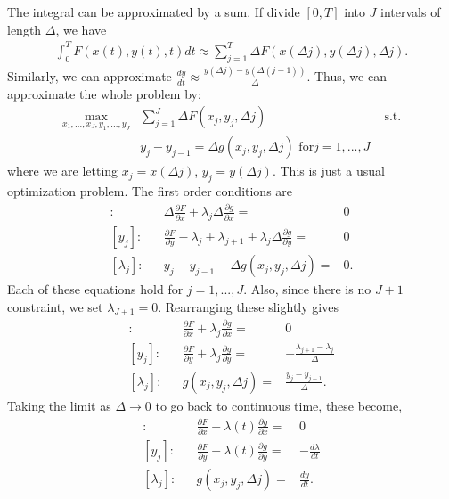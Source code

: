 The integral can be approximated by a sum. If divide $[0,T]$ into $J$
intervals of length $\Delta$, we have
\begin{align*}
  \int_0^T F(x(t),y(t),t) dt \approx \sum_{j=1}^T \Delta F(x(\Delta
  j), y(\Delta j) , \Delta j).
\end{align*}
Similarly, we can approximate $\frac{dy}{dt} \approx \frac{y(\Delta j)
  - y(\Delta(j-1))}{\Delta}$. 
Thus, we can approximate the whole problem by:
\begin{align*}
  \max_{x_1, ..., x_J, y_1, ..., y_J} & \sum_{j=1}^J \Delta F(x_j,
  y_j,\Delta j) 
  & \text{ s.t.} \\
  & y_j - y_{j-1} = \Delta g(x_j,y_j,\Delta j) \text{ for} j = 1,...,J
\end{align*}
where we are letting $x_j = x(\Delta j)$, $y_j = y(\Delta j)$. This is
just a usual optimization problem. The first order conditions are
\begin{align*}
  [x_j]: &&  \Delta \frac{\partial F}{\partial x} + \lambda_j \Delta
  \frac{\partial g}{\partial x} = & 0 \\
  [y_j]: &&  \frac{\partial F}{\partial y} - \lambda_j + \lambda_{j+1}
  + \lambda_j \Delta
  \frac{\partial g}{\partial y} = & 0 \\
  [\lambda_j]: && y_j - y_{j-1} - \Delta g(x_j,y_j,\Delta j) = & 0 .
\end{align*}
Each of these equations hold for $j = 1,..., J$. Also, since there is
no $J+1$ constraint, we set $\lambda_{J+1}=0$. Rearranging these
slightly gives
\begin{align*}
  [x_j]: &&  \frac{\partial F}{\partial x} + \lambda_j \frac{\partial
    g}{\partial x} = & 0 \\ 
  [y_j]: &&  \frac{\partial F}{\partial y} + \lambda_j 
  \frac{\partial g}{\partial y} = & -\frac{\lambda_{j+1} -
    \lambda_j}{\Delta} \\
  [\lambda_j]: && g(x_j,y_j,\Delta j) = & \frac{y_j - y_{j-1}}{\Delta}.
\end{align*}
Taking the limit as $\Delta \to 0$ to go back to continuous time,
these become,
\begin{align*}
  [x_j]: &&  \frac{\partial F}{\partial x} + \lambda(t) \frac{\partial
    g}{\partial x} = & 0 \\ 
  [y_j]: &&  \frac{\partial F}{\partial y} + \lambda(t)
  \frac{\partial g}{\partial y} = & -\frac{d\lambda}{dt} \\ 
  [\lambda_j]: && g(x_j,y_j,\Delta j) = & \frac{dy}{dt}. 
\end{align*}
